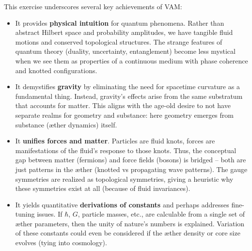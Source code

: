 \documentclass[a4paper,12pt]{article}
\begin{document}
    This exercise underscores several key achievements of VAM:
    \begin{itemize}
        \item It provides \textbf{physical intuition} for quantum phenomena. Rather than abstract Hilbert space and probability amplitudes, we have tangible fluid motions and conserved topological structures. The strange features of quantum theory (duality, uncertainty, entanglement) become less mystical when we see them as properties of a continuous medium with phase coherence and knotted configurations.
        \item It demystifies \textbf{gravity} by eliminating the need for spacetime curvature as a fundamental thing. Instead, gravity’s effects arise from the same substratum that accounts for matter. This aligns with the age-old desire to not have separate realms for geometry and substance: here geometry emerges from substance (æther dynamics) itself.
        \item It \textbf{unifies forces and matter}. Particles are fluid knots, forces are manifestations of the fluid’s response to those knots. Thus, the conceptual gap between matter (fermions) and force fields (bosons) is bridged – both are just patterns in the æther (knotted vs propagating wave patterns). The gauge symmetries are realized as topological symmetries, giving a heuristic why these symmetries exist at all (because of fluid invariances).
        \item It yields quantitative \textbf{derivations of constants} and perhaps addresses fine-tuning issues. If $\hbar$, $G$, particle masses, etc., are calculable from a single set of æther parameters, then the unity of nature’s numbers is explained. Variation of these constants could even be considered if the æther density or core size evolves (tying into cosmology).
    \end{itemize}
\end{document}
